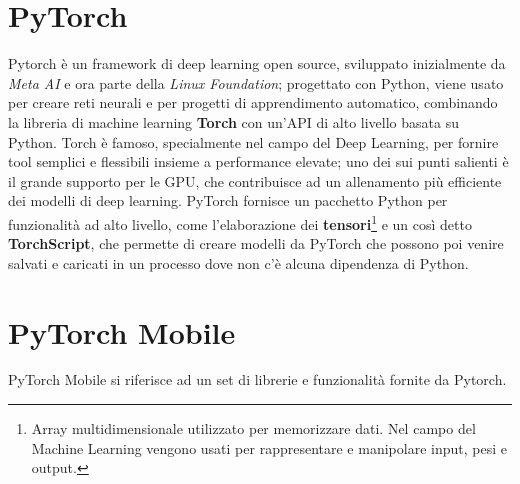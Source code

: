 \section{PyTorch}
Pytorch\cite{Pytorch} è un framework di deep learning open source, sviluppato inizialmente da \textit{Meta AI} e ora parte della \textit{Linux Foundation};
progettato con Python, viene usato per creare reti neurali e per progetti di apprendimento automatico,
combinando la libreria di machine learning \textbf{Torch}\cite{Torch} con un’API di alto livello basata su Python. Torch è famoso, specialmente nel campo
del Deep Learning, per fornire tool semplici e flessibili insieme a performance elevate; uno dei sui punti salienti è il grande supporto per le GPU, che 
contribuisce ad un allenamento più efficiente dei modelli di deep learning.
PyTorch fornisce un pacchetto Python per funzionalità ad alto livello, come l'elaborazione dei \textbf{tensori}\footnote{Array multidimensionale utilizzato per memorizzare dati. Nel campo del Machine Learning vengono usati per rappresentare e manipolare input, pesi e output.}
e un così detto \textbf{TorchScript}, che permette di creare modelli da PyTorch che possono poi venire salvati e caricati in un processo dove non c'è alcuna 
dipendenza di Python.

\section{PyTorch Mobile}
PyTorch Mobile si riferisce ad un set di librerie e funzionalità fornite da Pytorch. 
